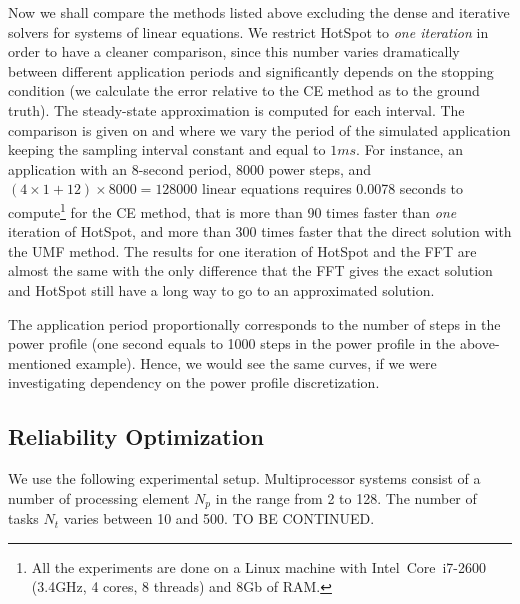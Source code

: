 Now we shall compare the methods listed above excluding the dense and iterative solvers for systems of linear equations. We restrict HotSpot to \emph{one iteration} in order to have a cleaner comparison, since this number varies dramatically between different application periods and significantly depends on the stopping condition (we calculate the error relative to the CE method as to the ground truth). The steady-state approximation is computed for each interval. The comparison is given on  and  where we vary the period of the simulated application keeping the sampling interval constant and equal to $1 ms$. For instance, an application with an 8-second period, 8000 power steps, and $(4 \times 1 + 12) \times 8000 = 128000$ linear equations requires 0.0078 seconds to compute\footnote{All the experiments are done on a Linux machine with Intel\textregistered\ Core\texttrademark\ i7-2600 (3.4GHz, 4 cores, 8 threads) and 8Gb of RAM.} for the CE method, that is more than 90 times faster than \emph{one} iteration of HotSpot, and more than 300 times faster that the direct solution with the UMF method. The results for one iteration of HotSpot and the FFT are almost the same with the only difference that the FFT gives the exact solution and HotSpot still have a long way to go to an approximated solution.

The application period proportionally corresponds to the number of steps in the power profile (one second equals to 1000 steps in the power profile in the above-mentioned example). Hence, we would see the same curves, if we were investigating dependency on the power profile discretization.

\subsection{Reliability Optimization}
We use the following experimental setup. Multiprocessor systems consist of a number of processing element $N_p$ in the range from 2 to 128. The number of tasks $N_t$ varies between 10 and 500. TO BE CONTINUED.
